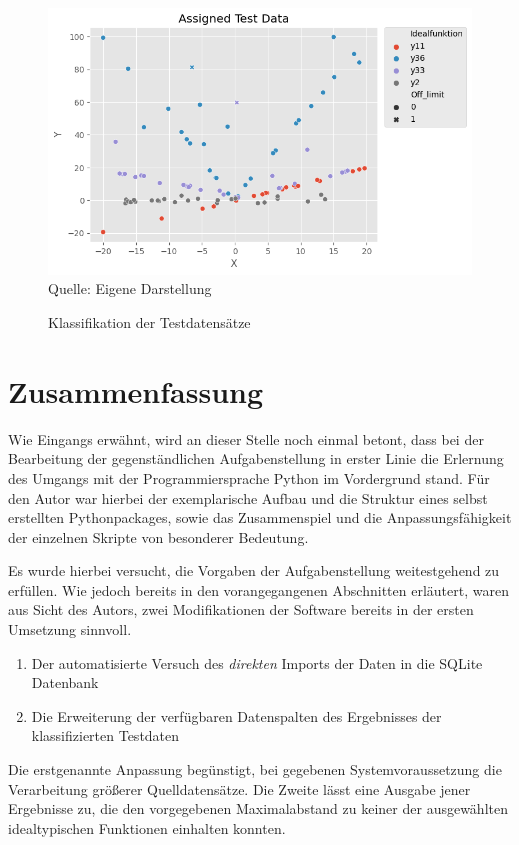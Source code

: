 \begin{figure}[h]
\centering
\caption{Klassifikation der Testdatensätze}
\includegraphics[width=13cm]{../output/figures/test.png}\\
Quelle: Eigene Darstellung
\label{fig:test}
\end{figure}


\chapter{Zusammenfassung}

Wie Eingangs erwähnt, wird an dieser Stelle noch einmal betont, dass bei der Bearbeitung der gegenständlichen Aufgabenstellung in erster Linie die Erlernung des Umgangs mit der Programmiersprache Python im Vordergrund stand. Für den Autor war hierbei der exemplarische Aufbau und die Struktur eines selbst erstellten Pythonpackages, sowie das Zusammenspiel und die Anpassungsfähigkeit der einzelnen Skripte von besonderer Bedeutung.

Es wurde hierbei versucht, die Vorgaben der Aufgabenstellung weitestgehend zu erfüllen. Wie jedoch bereits in den vorangegangenen Abschnitten erläutert, waren aus Sicht des Autors, zwei Modifikationen der Software bereits in der ersten Umsetzung sinnvoll.
\begin{enumerate}
 \itemsep0pt
 \item  Der automatisierte Versuch des \emph{direkten} Imports der Daten in die SQLite Datenbank
 \item  Die Erweiterung der verfügbaren Datenspalten des Ergebnisses der klassifizierten Testdaten
\end{enumerate}
Die erstgenannte Anpassung begünstigt, bei gegebenen Systemvoraussetzung die Verarbeitung größerer Quelldatensätze.
Die Zweite lässt eine Ausgabe jener Ergebnisse zu, die den vorgegebenen Maximalabstand zu keiner der ausgewählten idealtypischen Funktionen einhalten konnten.

